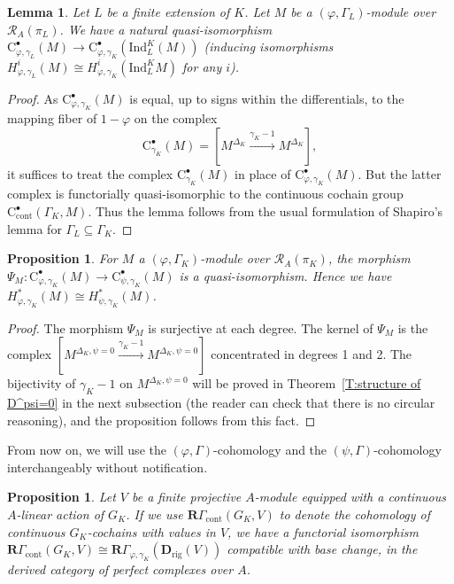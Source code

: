 \documentclass[12pt]{article}
\newtheorem{lemma}[theorem]{Lemma}
\newtheorem{prop}[theorem]{Proposition}
\theoremstyle{definition}
\numberwithin{equation}{theorem}
\newcommand{\calR}{\mathcal{R}}
\newcommand{\bbD}{\mathbf{D}}
\newcommand{\bbR}{\mathbf{R}}
\newcommand{\rmC}{\mathrm{C}}
\newcommand{\cont}{\mathrm{cont}}
\newcommand{\Ind}{\mathrm{Ind}}
\newcommand{\rig}{\mathrm{rig}}
\begin{document}
\begin{lemma}
Let $L$ be a finite extension of $K$. Let $M$ be a $(\varphi, \Gamma_L)$-module over $\calR_A(\pi_L)$.  We have a natural quasi-isomorphism $\rmC^\bullet_{\varphi, \gamma_L}(M) \to \rmC^\bullet_{\varphi, \gamma_K}(\Ind_L^K(M))$ (inducing isomorphisms $H^i_{\varphi, \gamma_L}(M) \cong H^i_{\varphi, \gamma_K}(\Ind_L^KM)$ for any $i$).
\end{lemma}
\begin{proof}
As $\rmC^\bullet_{\varphi,\gamma_K}(M)$ is equal, up to signs within
the differentials, to the mapping fiber of $1-\varphi$ on the complex
\[
\rmC^\bullet_{\gamma_K}(M) = [M^{\Delta_K} \xrightarrow{\gamma_K-1} M^{\Delta_K}],
\]
it suffices to treat the complex $\rmC^\bullet_{\gamma_K}(M)$ in place
of $\rmC^\bullet_{\varphi,\gamma_K}(M)$.  But the latter complex is
functorially quasi-isomorphic to the continuous cochain group
$\rmC_\cont^\bullet(\Gamma_K,M)$.  Thus the lemma follows from the
usual formulation of Shapiro's lemma for $\Gamma_L \subseteq
\Gamma_K$.
\end{proof}


\begin{prop}
\label{P:phi cohomology = psi cohomology}
For $M$ a $(\varphi, \Gamma_K)$-module over $\calR_A(\pi_K)$, the morphism $\Psi_M :
\rmC_{\varphi,\gamma_K}^\bullet(M) \to \rmC_{\psi,\gamma_K}^\bullet(M)$ is a
quasi-isomorphism.  Hence we have $H^*_{\varphi, \gamma_K}(M) \cong H^*_{\psi, \gamma_K}(M)$.
\end{prop}
\begin{proof}
The morphism $\Psi_M$ is surjective at each degree.
The kernel of $\Psi_M$ is the complex $[M^{\Delta_K, \psi =0} \xrightarrow{\gamma_K - 1} M^{\Delta_K,\psi=0}]$ concentrated in degrees 1 and 2.  The bijectivity of $\gamma_K-1$ on $M^{\Delta_K,\psi = 0}$ will be proved in Theorem~\ref{T:structure of D^psi=0} in the next subsection (the reader can check that there is no circular reasoning), and the proposition follows from this fact.
\end{proof}

From now on, we will use the $(\varphi, \Gamma)$-cohomology and the $(\psi, \Gamma)$-cohomology interchangeably without notification.

\begin{prop}
\label{P:comparison with Galois cohomology}
Let $V$ be a finite projective $A$-module equipped with a continuous
$A$-linear action of $G_K$.  If we use $\bbR\Gamma_\cont(G_K,V)$ to
denote the cohomology of continuous $G_K$-cochains with values in $V$,
we have a functorial isomorphism $\bbR\Gamma_\cont(G_K,V) \cong
\bbR\Gamma_{\varphi,\gamma_K}(\bbD_\rig(V))$ compatible with base
change, in the derived category of perfect complexes over $A$.
\end{prop}
\end{document}
